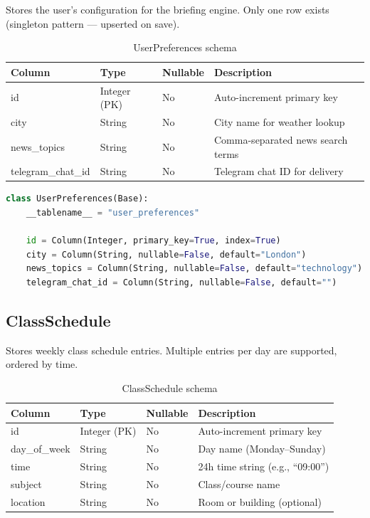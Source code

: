 \documentclass[12pt, a4paper]{article}
\begin{document}
Stores the user's configuration for the briefing engine. Only one row exists (singleton pattern --- upserted on save).

\begin{table}[h!]
\centering
\begin{tabular}{@{}llll@{}}
\toprule
\textbf{Column} & \textbf{Type} & \textbf{Nullable} & \textbf{Description} \\
\midrule
id               & Integer (PK)  & No  & Auto-increment primary key \\
city             & String        & No  & City name for weather lookup \\
news\_topics     & String        & No  & Comma-separated news search terms \\
telegram\_chat\_id & String      & No  & Telegram chat ID for delivery \\
\bottomrule
\end{tabular}
\caption{UserPreferences schema}
\end{table}

\begin{lstlisting}[language=Python, title={models.py --- UserPreferences}]
class UserPreferences(Base):
    __tablename__ = "user_preferences"

    id = Column(Integer, primary_key=True, index=True)
    city = Column(String, nullable=False, default="London")
    news_topics = Column(String, nullable=False, default="technology")
    telegram_chat_id = Column(String, nullable=False, default="")
\end{lstlisting}

\subsection{ClassSchedule}

Stores weekly class schedule entries. Multiple entries per day are supported, ordered by time.

\begin{table}[h!]
\centering
\begin{tabular}{@{}llll@{}}
\toprule
\textbf{Column} & \textbf{Type} & \textbf{Nullable} & \textbf{Description} \\
\midrule
id            & Integer (PK)  & No  & Auto-increment primary key \\
day\_of\_week & String        & No  & Day name (Monday--Sunday) \\
time          & String        & No  & 24h time string (e.g., ``09:00'') \\
subject       & String        & No  & Class/course name \\
location      & String        & No  & Room or building (optional) \\
\bottomrule
\end{tabular}
\caption{ClassSchedule schema}
\end{table}
\end{document}
